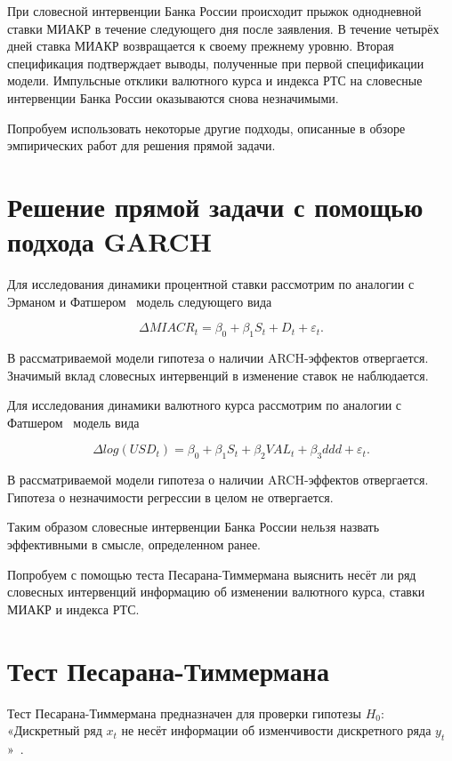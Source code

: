 \documentclass[14pt,a4paper, oneside]{extreport}
\newcommand{\e}{\varepsilon}
\def \Dt{\Delta}
\theoremstyle{plain}              %
\theoremstyle{definition}         %
\begin{document}
При словесной интервенции Банка России происходит прыжок однодневной ставки МИАКР в течение следующего дня после заявления. В течение четырёх дней ставка МИАКР возвращается к своему прежнему уровню. Вторая спецификация подтверждает выводы, полученные при первой спецификации модели. Импульсные отклики валютного курса и индекса РТС на словесные интервенции Банка России оказываются снова незначимыми.

Попробуем использовать некоторые другие подходы, описанные в обзоре эмпирических работ для решения прямой задачи.

\section{Решение прямой задачи с помощью подхода GARCH}

Для исследования динамики процентной ставки рассмотрим по аналогии с Эрманом и Фатшером~\cite{ehrmann2007communication} модель следующего вида 

\begin{equation}
\Dt MIACR_t = \beta_0 + \beta_1 S_t + D_t +\e_t.
\end{equation}

В рассматриваемой модели гипотеза о наличии ARCH-эффектов отвергается. Значимый вклад словесных интервенций в изменение ставок не наблюдается.

Для исследования динамики валютного курса рассмотрим по аналогии с Фатшером~\cite{fratzscher2008communication} модель вида

\begin{equation}
\Dt log(USD_t) = \beta_0 + \beta_1 S_t + \beta_2 VAL_t + \beta_3 ddd + \e_t.
\end{equation}

В рассматриваемой модели гипотеза о наличии ARCH-эффектов отвергается. Гипотеза о незначимости регрессии в целом не отвергается.

Таким образом словесные интервенции Банка России нельзя назвать эффективными в смысле, определенном ранее.

Попробуем с помощью теста Песарана-Тиммермана выяснить несёт ли ряд словесных интервенций информацию об изменении валютного курса, ставки МИАКР и индекса РТС.

\section{Тест Песарана-Тиммермана}

Тест Песарана-Тиммермана предназначен для проверки гипотезы $H_0:$ «Дискретный ряд $x_t$ не несёт информации об изменчивости дискретного ряда $y_t$»~\cite{pesaran2000recursive}.
\end{document}
